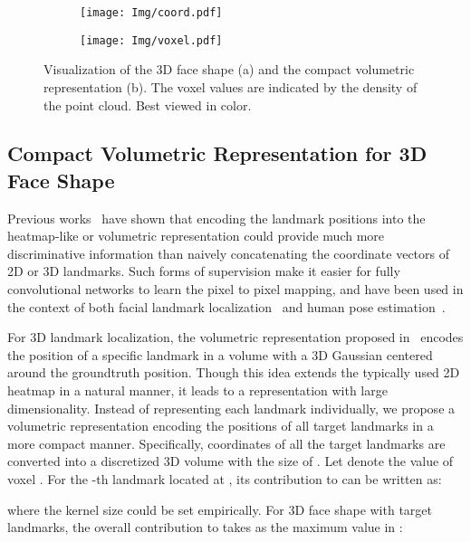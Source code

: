 \documentclass[a4paper,conference]{IEEEtran}
\begin{document}
\begin{figure}[t]
	\centering
	\begin{subfigure}[b]{0.2\textwidth}
		\centering
		\texttt{[image: Img/coord.pdf]}
		\caption{ }
		\label{fig:coordinate}
	\end{subfigure}
	\hspace{5mm}
	\begin{subfigure}[b]{0.2\textwidth}
		\centering
		\texttt{[image: Img/voxel.pdf]}
		\caption{ }
		\label{fig:volumetric}
	\end{subfigure}
	\caption{Visualization of the 3D face shape (a) and the compact volumetric representation (b). The voxel values are indicated by the density of the point cloud. Best viewed in color.}
	\label{fig:visualVoxel}
\end{figure}


\subsection{Compact Volumetric Representation for 3D Face Shape}

Previous works~\cite{tompson2014joint,pavlakos2017coarse} have shown that encoding the landmark positions into the heatmap-like or volumetric representation could provide much more discriminative information than naively concatenating the coordinate vectors of 2D or 3D landmarks.
Such forms of supervision make it easier for fully convolutional networks to learn the pixel to pixel mapping,
and have been used in the context of both facial landmark localization~\cite{bulat2016convolutional} and human pose estimation~\cite{tompson2014joint}.

For 3D landmark localization, the volumetric representation proposed in~\cite{pavlakos2017coarse} encodes the position of a specific landmark in a volume with a 3D Gaussian centered around the groundtruth position. 
Though this idea extends the typically used 2D heatmap in a natural manner, it leads to a representation with large dimensionality.
Instead of representing each landmark individually, we propose a volumetric representation encoding the positions of all target landmarks in a more compact manner.
Specifically, coordinates of all the target landmarks are converted into a discretized 3D volume  with the size of . 
Let  denote the value of voxel .
For the -th landmark located at , its contribution to  can be written as:

where the kernel size  could be set empirically.
For 3D face shape with  target landmarks, the overall contribution to  takes as the maximum value in :
\end{document}
